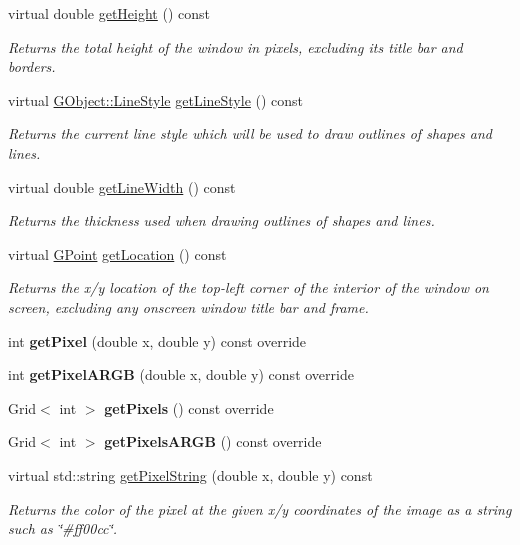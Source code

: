 \begin{DoxyCompactItemize}
virtual double \mbox{\hyperlink{classGWindow_a1e7e353362434072875264cf95629f99}{get\+Height}} () const
\begin{DoxyCompactList}\small\item\em Returns the total height of the window in pixels, excluding its title bar and borders. \end{DoxyCompactList}\item 
virtual \mbox{\hyperlink{classGObject_a86e0f5648542856159bb40775c854aa7}{G\+Object\+::\+Line\+Style}} \mbox{\hyperlink{classGDrawingSurface_aaf1f5ea8281e5e3486662878d26f0a13}{get\+Line\+Style}} () const
\begin{DoxyCompactList}\small\item\em Returns the current line style which will be used to draw outlines of shapes and lines. \end{DoxyCompactList}\item 
virtual double \mbox{\hyperlink{classGDrawingSurface_a85ff266dc3eb63d9f2d8e5a4487fd3c0}{get\+Line\+Width}} () const
\begin{DoxyCompactList}\small\item\em Returns the thickness used when drawing outlines of shapes and lines. \end{DoxyCompactList}\item 
virtual \mbox{\hyperlink{structGPoint}{G\+Point}} \mbox{\hyperlink{classGWindow_a4f83802015511edeb63b892830812c11}{get\+Location}} () const
\begin{DoxyCompactList}\small\item\em Returns the x/y location of the top-\/left corner of the interior of the window on screen, excluding any onscreen window title bar and frame. \end{DoxyCompactList}\item 
int {\bfseries get\+Pixel} (double x, double y) const override
\item 
int {\bfseries get\+Pixel\+A\+R\+GB} (double x, double y) const override
\item 
Grid$<$ int $>$ {\bfseries get\+Pixels} () const override
\item 
Grid$<$ int $>$ {\bfseries get\+Pixels\+A\+R\+GB} () const override
\item 
virtual std\+::string \mbox{\hyperlink{classGDrawingSurface_a8da04ef488ec5fa498fbbffaf50928fd}{get\+Pixel\+String}} (double x, double y) const
\begin{DoxyCompactList}\small\item\em Returns the color of the pixel at the given x/y coordinates of the image as a string such as \char`\"{}\#ff00cc\char`\"{}. \end{DoxyCompactList}\item 

\end{DoxyCompactItemize}
